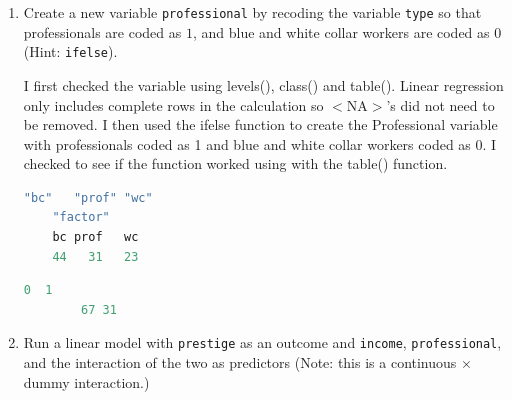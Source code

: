 \documentclass[12pt,letterpaper]{article}
\begin{document}
\newpage
\begin{enumerate}
	
	\item [(a)]
	Create a new variable \texttt{professional} by recoding the variable \texttt{type} so that professionals are coded as $1$, and blue and white collar workers are coded as $0$ (Hint: \texttt{ifelse}).
	
	\noindent I first checked the variable using levels(), class() and table(). Linear regression only includes complete rows in the calculation so $<$NA$>$'s did not need to be removed. I then used the ifelse function to create the Professional variable with professionals coded as 1 and blue and white collar workers coded as 0. I checked to see if the function worked using with the table() function.  \\
	
	\begin{lstlisting}[language=R]
	"bc"   "prof" "wc"  
	"factor"
	bc prof   wc 
	44   31   23 	\end{lstlisting}
	
		\begin{lstlisting}[language=R]
		0  1 
		67 31  	\end{lstlisting}
	
	\item [(b)]
	Run a linear model with \texttt{prestige} as an outcome and \texttt{income}, \texttt{professional}, and the interaction of the two as predictors (Note: this is a continuous $\times$ dummy interaction.)
	

\end{enumerate}
\end{document}

